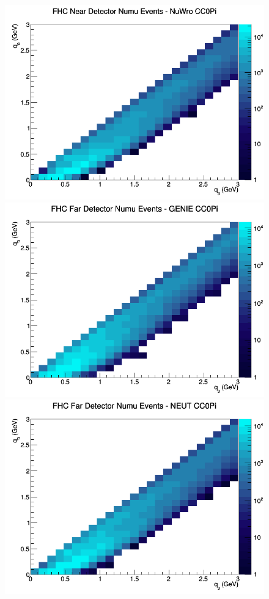 \begin{figure}[h]
\includegraphics[width=\linewidth]{q0_q3/nominal/CC0Pi_FHC_ND_numu_q3_q0_NuWro.png}
\endminipage
\newline
{}
\includegraphics[width=\linewidth]{q0_q3/nominal/CC0Pi_FHC_FD_numu_q3_q0_GENIE.png}
\endminipage
{}
\includegraphics[width=\linewidth]{q0_q3/nominal/CC0Pi_FHC_FD_numu_q3_q0_NEUT.png}

\end{figure}
